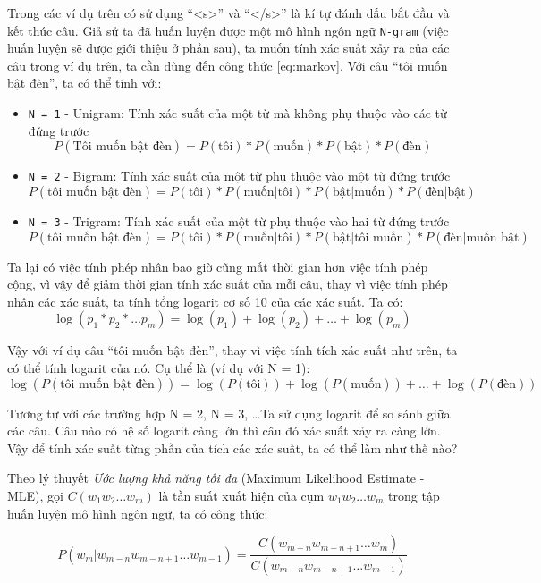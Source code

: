 \documentclass[12pt]{report}
\begin{document}
Trong các ví dụ trên có sử dụng ``<s>'' và ``</s>'' là kí tự đánh dấu bắt đầu và kết thúc câu. Giả sử ta đã huấn luyện được một mô hình ngôn ngữ \texttt{N-gram} (việc huấn luyện sẽ được giới thiệu ở phần sau), ta muốn tính xác suất xảy ra của các câu trong ví dụ trên, ta cần dùng đến công thức \ref{eq:markov}. Với câu ``tôi muốn bật đèn'', ta có thể tính với:

\begin{itemize}
	\item \texttt{N = 1} - Unigram: Tính xác suất của một từ mà không phụ thuộc vào các từ đứng trước
		\[P(\text{Tôi muốn bật đèn}) = P(\text{tôi}) * P(\text{muốn}) * P(\text{bật}) * P(\text{đèn})\]
	\item \texttt{N = 2} - Bigram: Tính xác suất của một từ phụ thuộc vào một từ đứng trước
		\[P(\text{tôi muốn bật đèn}) = P(\text{tôi}) * P(\text{muốn}|\text{tôi}) * P(\text{bật}|\text{muốn}) * P(\text{đèn}|\text{bật})\]
	\item \texttt{N = 3} - Trigram: Tính xác suất của một từ phụ thuộc vào hai từ đứng trước
		\[P(\text{tôi muốn bật đèn}) = P(\text{tôi}) * P(\text{muốn}|\text{tôi}) * P(\text{bật}|\text{tôi muốn}) * P(\text{đèn}|\text{muốn bật})\]
\end{itemize}

Ta lại có việc tính phép nhân bao giờ cũng mất thời gian hơn việc tính phép cộng, vì vậy để giảm thời gian tính xác suất của mỗi câu, thay vì việc tính phép nhân các xác suất, ta tính tổng logarit cơ số 10 của các xác suất. Ta có:
\[\log(p_1*p_2* \ldots p_m) = \log(p_1) + \log(p_2) + \ldots + \log(p_m)\]

Vậy với ví dụ câu ``tôi muốn bật đèn'', thay vì việc tính tích xác suất như trên, ta có thể tính logarit của nó. Cụ thể là (ví dụ với N = 1):
\[\log(P(\text{tôi muốn bật đèn})) = \log(P(\text{tôi})) + \log(P(\text{muốn})) + \ldots + \log(P(\text{đèn}))\]

Tương tự với các trường hợp N = 2, N = 3, \ldots Ta sử dụng logarit để so sánh giữa các câu. Câu nào có hệ số logarit càng lớn thì câu đó xác suất xảy ra càng lớn. Vậy để tính xác suất từng phần của tích các xác suất, ta có thể làm như thế nào?

Theo lý thuyết \textit{Ước lượng khả năng tối đa} (Maximum Likelihood Estimate - MLE), gọi $C(w_1w_2 \ldots w_m)$  là tần suất xuất hiện của cụm $w_1w_2 \ldots w_m$ trong tập huấn luyện mô hình ngôn ngữ, ta có công thức:

\[P(w_m|w_{m-n}w_{m-n+1} \ldots w_{m-1}) = \frac{C(w_{m-n}w_{m-n+1} \ldots w_m)}{C(w_{m-n}w_{m-n+1} \ldots w_{m-1})}\]
\end{document}
